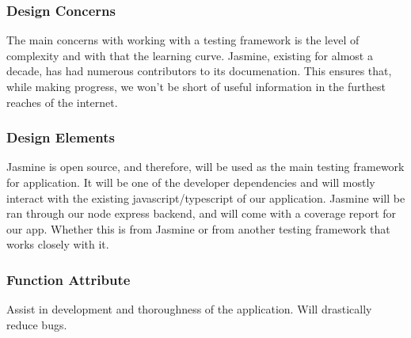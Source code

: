 \documentclass[letterpaper, 10pt, draftclsnofoot, compsoc, onecolumn]{IEEEtran}
\begin{document}
\subsubsection{Design Concerns}
{\noindent The main concerns with working with a testing framework is the level of complexity and with that the learning curve.
Jasmine, existing for almost a decade, has had numerous contributors to its documenation. This ensures that, while making progress,
we won't be short of useful information in the furthest reaches of the internet. \par}

\subsubsection{Design Elements}
{\noindent Jasmine is open source, and therefore, will be used as the main testing framework for application.
It will be one of the developer dependencies and will mostly interact with the existing javascript/typescript of our application.
Jasmine will be ran through our node express backend, and will come with a coverage report for our app. Whether this is from Jasmine or
from another testing framework that works closely with it. \par}

\subsubsection{Function Attribute}
{\noindent Assist in development and thoroughness of the application. Will drastically reduce bugs. \par}

\newpage
\end{document}

